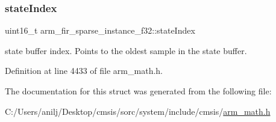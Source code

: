 \subsubsection{\texorpdfstring{state\+Index}{stateIndex}}
{\footnotesize\ttfamily uint16\+\_\+t arm\+\_\+fir\+\_\+sparse\+\_\+instance\+\_\+f32\+::state\+Index}

state buffer index. Points to the oldest sample in the state buffer. 

Definition at line 4433 of file arm\+\_\+math.\+h.



The documentation for this struct was generated from the following file\+:\begin{DoxyCompactItemize}
\item 
C\+:/\+Users/anilj/\+Desktop/cmsis/sorc/system/include/cmsis/\hyperlink{arm__math_8h}{arm\+\_\+math.\+h}\end{DoxyCompactItemize}
